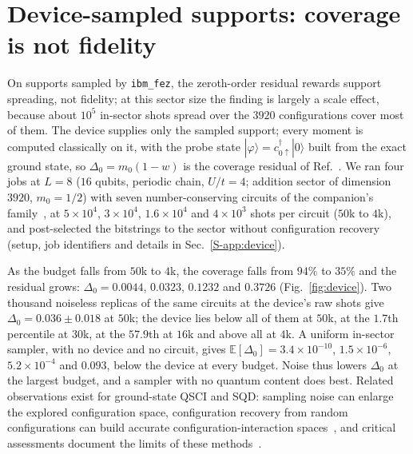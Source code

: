 \documentclass[aps,prb,reprint,onecolumn,12pt,superscriptaddress,longbibliography,floatfix]{revtex4-2}
\begin{document}
\section{Device-sampled supports: coverage is not fidelity}
\label{sec:device}
On supports sampled by \texttt{ibm\_fez}, the zeroth-order residual rewards support spreading, not fidelity; at this sector size the finding is largely a scale effect, because about $10^5$ in-sector shots spread over the $3920$ configurations cover most of them. The device supplies only the sampled support; every moment is computed classically on it, with the probe state $|\varphi\rangle=c^\dagger_{0\uparrow}|0\rangle$ built from the exact ground state, so $\Delta_0=m_0(1-w)$ is the coverage residual of Ref.~\cite{SQDspec2608}. We ran four jobs at $L=8$ ($16$ qubits, periodic chain, $U/t=4$; addition sector of dimension $3920$, $m_0=1/2$) with seven number-conserving circuits of the companion's family~\cite{SQDspec2608}, at $5\times10^{4}$, $3\times10^{4}$, $1.6\times10^{4}$ and $4\times10^{3}$ shots per circuit ($50$k to $4$k), and post-selected the bitstrings to the sector without configuration recovery (setup, job identifiers and details in Sec.~\ref{S-app:device}).

As the budget falls from $50$k to $4$k, the coverage falls from $94\%$ to $35\%$ and the residual grows: $\Delta_0=0.0044$, $0.0323$, $0.1232$ and $0.3726$ (Fig.~\ref{fig:device}). Two thousand noiseless replicas of the same circuits at the device's raw shots give $\Delta_0={0.036\pm0.018}$ at $50$k; the device lies below all of them at $50$k, at the $1.7$th percentile at $30$k, at the $57.9$th at $16$k and above all at $4$k. A uniform in-sector sampler, with no device and no circuit, gives $\mathbb{E}[\Delta_0]=3.4\times10^{-10}$, $1.5\times10^{-6}$, $5.2\times10^{-4}$ and $0.093$, below the device at every budget. Noise thus lowers $\Delta_0$ at the largest budget, and a sampler with no quantum content does best. Related observations exist for ground-state QSCI and SQD: sampling noise can enlarge the explored configuration space, configuration recovery from random configurations can build accurate configuration-interaction spaces~\cite{VaqueroSabater2026}, and critical assessments document the limits of these methods~\cite{Reinholdt2025,GaberleJattana2026}.
\end{document}
